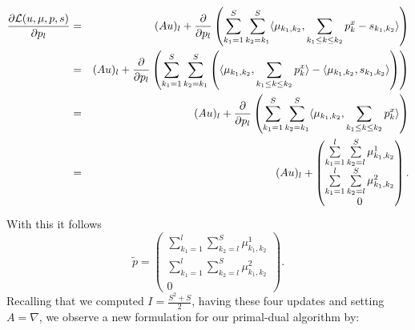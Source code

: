 \documentclass[abstracton]{scrreprt}
\begin{document}
            \begin{eqnarray}
                \frac{\partial \mathcal{L}(u, \mu, p, s)}{\partial p_{l}} &=& (Au)_{l} + \frac{\partial}{\partial p_{l}} \left(\sum_{k_{1} = 1}^{S} \sum_{k_{2} = k_{1}}^{S} \langle \mu_{k_{1}, k_{2}}, \sum_{k_{1} \le k \le k_{2}} p^{x}_{k} - s_{k_{1}, k_{2}} \rangle \right) \notag \\
                &=& (Au)_{l} + \frac{\partial}{\partial p_{l}} \left(\sum_{k_{1} = 1}^{S} \sum_{k_{2} = k_{1}}^{S} \left( \langle \mu_{k_{1}, k_{2}}, \sum_{k_{1} \le k \le k_{2}} p^{x}_{k} \rangle - \langle \mu_{k_{1}, k_{2}}, s_{k_{1}, k_{2}} \rangle \right) \right) \notag \\
                &=& (Au)_{l} + \frac{\partial}{\partial p_{l}} \left(\sum_{k_{1} = 1}^{S} \sum_{k_{2} = k_{1}}^{S} \langle \mu_{k_{1}, k_{2}}, \sum_{k_{1} \le k \le k_{2}} p^{x}_{k} \rangle \right) \notag \\
                &=& (Au)_{l} + 
                    \begin{pmatrix}
                        \sum\limits_{k_{1} = 1}^{l} \sum\limits_{k_{2} = l}^{S} \mu_{k_{1}, k_{2}}^{1} \\
                        \sum\limits_{k_{1} = 1}^{l} \sum\limits_{k_{2} = l}^{S} \mu_{k_{1}, k_{2}}^{2} \\
                        0
                    \end{pmatrix}.\notag
            \end{eqnarray}
        With this it follows
            $$
                \tilde{p} =
                    \begin{pmatrix}
                        \sum\limits_{k_{1} = 1}^{l} \sum\limits_{k_{2} = l}^{S} \mu_{k_{1}, k_{2}}^{1} \\
                        \sum\limits_{k_{1} = 1}^{l} \sum\limits_{k_{2} = l}^{S} \mu_{k_{1}, k_{2}}^{2} \\
                        0
                    \end{pmatrix}.
            $$
        Recalling that we computed $I = \frac{S^{2} + S}{2}$, having these four updates and setting $A = \nabla$, we observe a new formulation for our primal-dual algorithm by:\newpage
\end{document}
